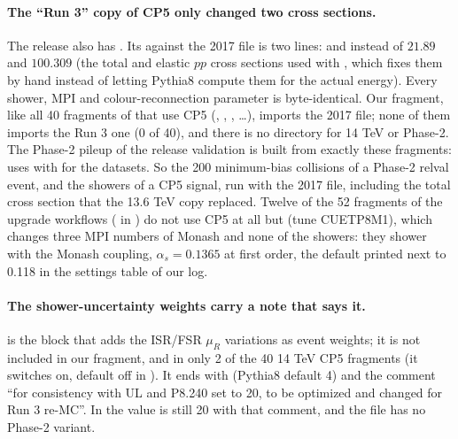 \paragraph{The ``Run 3'' copy of CP5 only changed two cross sections.} The release also has
. Its  against the
2017 file is two lines:  and  instead of
$21.89$ and $100.309$ (the total and elastic $pp$ cross sections used with , which fixes
them by hand instead of letting Pythia8 compute them for the actual energy). Every shower, MPI and colour-reconnection
parameter is byte-identical. Our fragment, like all 40  fragments of
 that use CP5 (,
, , \ldots), imports the
2017 file; none of them imports the Run 3 one (0 of 40), and there is no  directory for 14 TeV or
Phase-2. The Phase-2 pileup of the release validation is built from exactly these fragments:
 uses  with
 for the  datasets. So the 200 minimum-bias collisions of a Phase-2 relval event, and
the showers of a CP5 signal, run with the 2017 file, including the total cross section that the 13.6 TeV copy
replaced. Twelve of the 52  fragments of the upgrade workflows ( in
) do not use CP5 at all but  (tune
CUETP8M1), which changes three MPI numbers of Monash and none of the showers: they shower with the Monash
coupling, $\alpha_s = 0.1365$ at first order, the default printed next to 0.118 in the settings table of our log.

\paragraph{The shower-uncertainty weights carry a note that says it.}
 is the block that
adds the ISR/FSR $\mu_R$ variations as event weights; it is not included in our fragment, and in only 2 of the
40 14 TeV CP5 fragments (it switches  on, default off in
). It ends with  (Pythia8 default 4) and the comment ``for consistency with
UL and P8.240 set to 20, to be optimized and changed for Run 3 re-MC''. In  the value is
still 20 with that comment, and the file has no Phase-2 variant.

